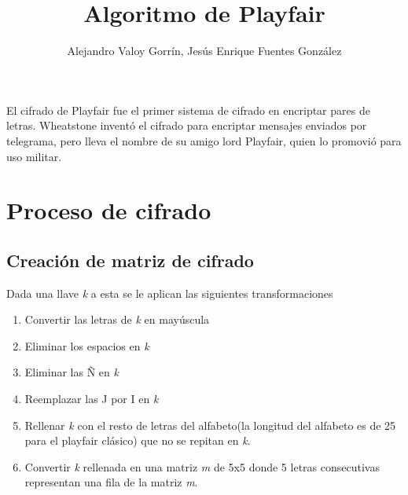 \documentclass{article}
\title{Algoritmo de Playfair}
\author{Alejandro Valoy Gorrín, Jesús Enrique Fuentes González}
\begin{document}
    \maketitle
    El cifrado de Playfair fue el primer sistema de cifrado en encriptar
    pares de letras. Wheatstone inventó el cifrado para encriptar mensajes
    enviados por telegrama, pero lleva el nombre de su amigo lord Playfair,
    quien lo promovió para uso militar. 

    \section{Proceso de cifrado}
    \subsection{Creación de matriz de cifrado}
    Dada una llave \textit{k} a esta se le aplican las siguientes transformaciones
    \begin{enumerate}
        \item Convertir las letras de \textit{k} en mayúscula
        \item Eliminar los espacios en \textit{k}
        \item Eliminar las Ñ  en \textit{k}
        \item Reemplazar las J por I en \textit{k}
        \item Rellenar \textit{k} con el resto de letras del alfabeto(la longitud del alfabeto es de 25 para el playfair clásico) que no se repitan en \textit{k}.
        \item Convertir \textit{k} rellenada en una matriz \textit{m} de 5x5 donde 5 letras consecutivas representan una fila de la matriz \textit{m}. 
    \end{enumerate}
\end{document}
